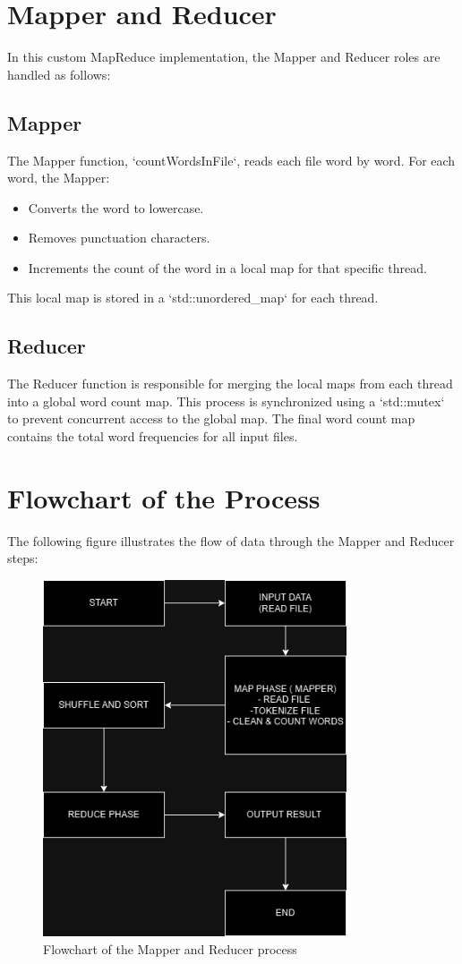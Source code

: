 \documentclass[12pt]{article}
\begin{document}
\section{Mapper and Reducer}
In this custom MapReduce implementation, the Mapper and Reducer roles are handled as follows:

\subsection{Mapper}
The Mapper function, `countWordsInFile`, reads each file word by word. For each word, the Mapper:
\begin{itemize}
    \item Converts the word to lowercase.
    \item Removes punctuation characters.
    \item Increments the count of the word in a local map for that specific thread.
\end{itemize}
This local map is stored in a `std::unordered\_map` for each thread.

\subsection{Reducer}
The Reducer function is responsible for merging the local maps from each thread into a global word count map. This process is synchronized using a `std::mutex` to prevent concurrent access to the global map. The final word count map contains the total word frequencies for all input files.

\section{Flowchart of the Process}
The following figure illustrates the flow of data through the Mapper and Reducer steps:

\begin{figure}[h!]
\centering
\includegraphics[width=0.8\textwidth]{mapreduce_flowchart.png}
\caption{Flowchart of the Mapper and Reducer process}
\label{fig:flowchart}
\end{figure}
\end{document}
